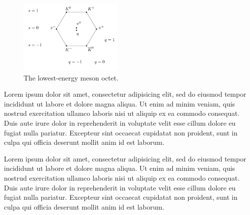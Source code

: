 
\begin{figure}
    \vspace{-0.3cm}
    \centering
    \includegraphics[width=0.45\textwidth]{figs/example/meson-octet}
    \caption{
        The lowest-energy meson octet.
    }
    \label{fig:meson-octet}
    \vspace{-0.3cm}
\end{figure}

Lorem ipsum dolor sit amet, consectetur adipisicing elit, sed do eiusmod tempor
incididunt ut labore et dolore magna aliqua. Ut enim ad minim veniam, quis
nostrud exercitation ullamco laboris nisi ut aliquip ex ea commodo consequat.
Duis aute irure dolor in reprehenderit in voluptate velit esse cillum dolore
eu fugiat nulla pariatur. Excepteur sint occaecat cupidatat non proident, sunt
in culpa qui officia deserunt mollit anim id est laborum.

Lorem ipsum dolor sit amet, consectetur adipisicing elit, sed do eiusmod tempor
incididunt ut labore et dolore magna aliqua. Ut enim ad minim veniam, quis
nostrud exercitation ullamco laboris nisi ut aliquip ex ea commodo consequat.
Duis aute irure dolor in reprehenderit in voluptate velit esse cillum dolore
eu fugiat nulla pariatur. Excepteur sint occaecat cupidatat non proident, sunt
in culpa qui officia deserunt mollit anim id est laborum.



